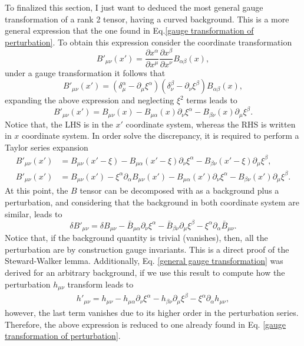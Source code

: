 \documentclass{article}
\begin{document}
To finalized this section, I just want to deduced the most general gauge transformation
of a rank 2 tensor, having a curved background. This is a more general expression that the one
found in Eq.\eqref{gauge transformation of perturbation}. To obtain this expression consider
the coordinate transformation
\begin{equation}
    B'_{\mu\nu}(x') = \frac{\partial x^\alpha}{\partial x^{\mu}}\frac{\partial x^\beta}{\partial x^{\nu}}
    B_{\alpha\beta}(x),
\end{equation}
under a gauge transformation it follows that
\begin{equation}
    B'_{\mu\nu}(x') = \left(\delta ^{\alpha}_{\mu} - \partial_{\mu}\xi^{\alpha}\right)
    \left(\delta ^{\beta}_{\nu} - \partial_{\nu}\xi^{\beta}\right)
    B_{\alpha\beta}(x),
\end{equation}
expanding the above expression and neglecting $\xi^2$ terms leads to
\begin{equation}
    B'_{\mu\nu}(x') = B_{\mu\nu}(x) -  B_{\mu\alpha}(x)\partial_{\nu}\xi^{\alpha}
    - B_{\beta\nu}(x)\partial_{\mu}\xi^{\beta}.
\end{equation}
Notice that, the LHS is in the $x'$ coordinate system, whereas the RHS is written in $x$
coordinate system. In order solve the discrepancy, it is required to perform a Taylor series
expansion
\begin{align}
    B'_{\mu\nu}(x') & = B_{\mu\nu}(x' - \xi) -  B_{\mu\alpha}(x' - \xi)\partial_{\nu}\xi^{\alpha}
    - B_{\beta\nu}(x' - \xi)\partial_{\mu}\xi^{\beta},\\
    B'_{\mu\nu}(x') & = B_{\mu\nu}(x') - \xi^{\alpha}\partial_{\alpha}B_{\mu\nu}(x') -  
    B_{\mu\alpha}(x')\partial_{\nu}\xi^{\alpha} - B_{\beta\nu}(x')\partial_{\mu}\xi^{\beta}.
\end{align}
At this point, the $B$ tensor can be decomposed with as a background plus a perturbation, and 
considering that the background in both coordinate system are similar, leads to
\begin{equation}
    \label{general gauge transformation}
    \delta B'_{\mu\nu} = \delta B_{\mu\nu} - \bar{B}_{\mu\alpha}\partial_{\nu}\xi^{\alpha}
    - \bar{B}_{\beta\nu}\partial_{\mu}\xi^{\beta} - \xi^{\alpha}\partial_{\alpha}\bar{B}_{\mu\nu}.
\end{equation} 
Notice that, if the background quantity is trivial (vanishes), then, all the perturbation are by 
construction gauge invariants. This is a direct proof of the Steward-Walker lemma. Additionally,
Eq. \eqref{general gauge transformation} was derived for an arbitrary background, if we use this
result to compute how the perturbation $h_{\mu\nu}$ transform leads to
\begin{align}
    h'_{\mu\nu} = h_{\mu\nu} - h_{\mu\alpha}\partial_{\nu}\xi^{\alpha}
    - h_{\beta\nu}\partial_{\mu}\xi^{\beta} - \xi^{\alpha}\partial_{\alpha}h_{\mu\nu},
\end{align}
however, the last term vanishes due to its higher order in the perturbation series. Therefore,
the above expression is reduced to one already found in 
Eq. \eqref{gauge transformation of perturbation}.
\end{document}
